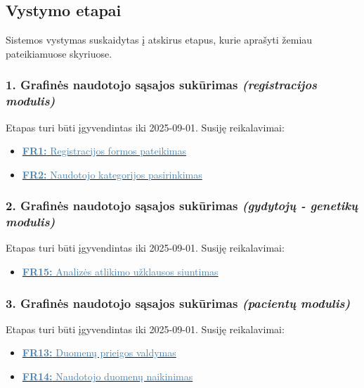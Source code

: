 \documentclass[12pt]{article}
\begin{document}
\newpage

\subsection{Vystymo etapai}
Sistemos vystymas suskaidytas į atskirus etapus, kurie aprašyti žemiau
pateikiamuose skyriuose.

\subsubsection*{\noindent \textbf{1.} Grafinės naudotojo sąsajos sukūrimas
\emph{(registracijos modulis)}}

\noindent Etapas turi būti įgyvendintas iki 2025-09-01. Susiję reikalavimai:

\begin{itemize}[leftmargin=0.3cm, itemsep=-7pt, topsep=1pt, after=\vspace{-1em}]
    \item \hyperlink{FR1}{\textcolor{steelblue}{\textbf{FR1:} Registracijos
    formos pateikimas}}
    \item \hyperlink{FR2}{\textcolor{steelblue}{\textbf{FR2:} Naudotojo
    kategorijos pasirinkimas}}
\end{itemize}

\subsubsection*{\noindent \textbf{2.} Grafinės naudotojo sąsajos sukūrimas
\emph{(gydytojų - genetikų modulis)}}

\noindent Etapas turi būti įgyvendintas iki 2025-09-01. Susiję reikalavimai:
\begin{itemize}[leftmargin=0.3cm, itemsep=-7pt, topsep=1pt, after=\vspace{-1em}]
    \item \hyperlink{FR15}{\textcolor{steelblue}{\textbf{FR15:} Analizės
    atlikimo užklausos siuntimas}}
\end{itemize}

\subsubsection*{\noindent \textbf{3.} Grafinės naudotojo sąsajos sukūrimas
\emph{(pacientų modulis)}}

\noindent Etapas turi būti įgyvendintas iki 2025-09-01. Susiję reikalavimai:

\begin{itemize}[leftmargin=0.3cm, itemsep=-7pt, topsep=1pt, after=\vspace{-1em}]
    \item \hyperlink{FR13}{\textcolor{steelblue}{\textbf{FR13:} Duomenų prieigos
    valdymas}}
    \item \hyperlink{FR14}{\textcolor{steelblue}{\textbf{FR14:} Naudotojo
    duomenų naikinimas}}
\end{itemize}
\end{document}

